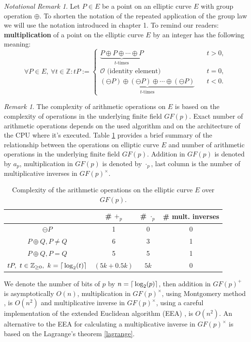 \documentclass[thesis=M,english]{FITthesis}[2012/10/20]
\theoremstyle{remark}
\newtheorem*{RM}{Remark}
\newtheorem*{NRM}{Notational Remark}
\theoremstyle{definition}
\begin{document}
\begin{NRM}
Let $P \in E$ be a point on an elliptic curve $E$ with group operation $\oplus$. To shorten the notation of the repeated application of the group law we will use the notation introduced in chapter 1. To remind our readers: \textbf{multiplication} of a point on the elliptic curve $E$ by an integer has the following meaning:
$$
\forall P \in E,\ \forall t \in \mathbb{Z}: tP := \begin{cases} \underbrace{P \oplus P \oplus \cdots \oplus P}_{\text{$t$-times}} &\quad t > 0, \\
\mathcal{O} \text{ (identity element) } &\quad t = 0, \\
\underbrace{(\ominus P) \oplus (\ominus P) \oplus \cdots \oplus (\ominus P)}_{\text{$t$-times}} &\quad t < 0.
\end{cases}
$$
\end{NRM} 
\begin{RM}
The complexity of arithmetic operations on $E$ is based on the complexity of operations in the underlying finite field $GF(p)$.  Exact number of arithmetic operations depends on the used algorithm and on the architecture of the CPU where it's executed. Table \ref{tblComp} provides a brief summary of the relationship between the operations on elliptic curve $E$ and number of arithmetic operations in the underlying finite field $GF(p)$. Addition in $GF(p)$ is denoted by $a_p$, multiplication in $GF(p)$ is denoted by $\cdot_p$, last column is the number of multiplicative inverses in $GF(p)^{\times}$. 
\begin{table}[!h]
\centering
\begin{tabular}{ |c||c|c|c| } 
 \hline
 & \# $+_p$ & \# $\cdot_p$ & \# mult. inverses \\ 
 \hline
 \hline
$\ominus P$ & 1 & 0 & 0  \\  \hline
$P \oplus Q, P \neq Q$ & 6 & 3 & 1 \\  \hline
$P \oplus Q, P = Q$ & 5 & 5 & 1 \\  \hline
$tP,\ t \in \mathbb{Z}_{\geq 0},\ k = \mathlarger{\lceil} \log_2(t) \mathlarger{\rceil}$ & $ (5k + 0.5k)$\footnotemark & $5k$ & 0 \\ \hline
\end{tabular}
\caption{Complexity of the arithmetic operations on the elliptic curve $E$ over $GF(p)$.}
\label{tblComp}
\end{table}
\end{RM}
\noindent We denote the number of bits of $p$ by $n = \mathlarger{\lceil} \log_2(p) \mathlarger{\rceil}$, then addition in $GF(p)^{+}$ is asymptotically $O(n)$, multiplication in $GF(p)^{\times}$, using Montgomery method \cite{handbook}, is $O(n^2)$ and multiplicative inverse in $GF(p)^{\times}$, using a careful implementation of the extended Euclidean algorithm (EEA) \cite{handbook}, is $O(n^2)$. An alternative to the EEA for calculating a multiplicative inverse in $GF(p)^{\times}$ is based on the Lagrange's theorem \ref{lagrange}. 
\end{document}
